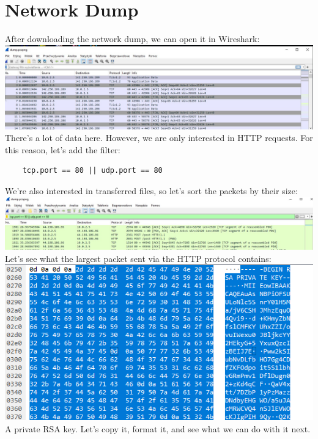 \documentclass{article}
\begin{document}
\section{Network Dump}
After downloading the network dump, we can open it in Wireshark:
\vspace{3mm} \\
\includegraphics[width=\textwidth]{"image60.jpeg"}
There’s a lot of data here. However, we are only interested in HTTP requests. For this reason, let’s add the filter:
\begin{verbatim}
    tcp.port == 80 || udp.port == 80
\end{verbatim}
We’re also interested in transferred files, so let’s sort the packets by their size:
\vspace{3mm} \\
\includegraphics[width=\textwidth]{"image61.jpeg"}
Let’s see what the largest packet sent via the HTTP protocol contains:
\vspace{3mm} \\
\includegraphics[width=\textwidth]{"image62.png"}
A private RSA key. Let’s copy it, format it, and see what we can do with it next.
\end{document}
